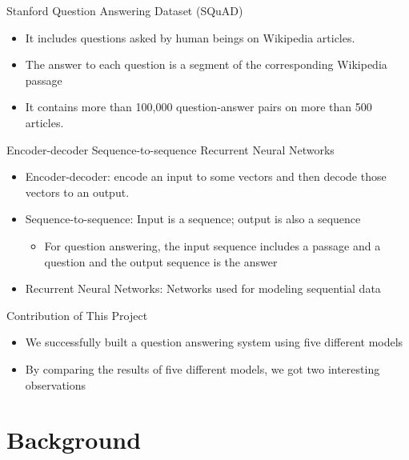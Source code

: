 \documentclass{beamer}
\begin{document}
\begin{frame}{Stanford Question Answering Dataset (SQuAD)}
    \begin{itemize}
        \item It includes questions asked by human beings on Wikipedia articles.
        \item The answer to each question is a segment of the corresponding Wikipedia passage
        \item It contains more than 100,000 question-answer pairs on more than 500 articles.
    \end{itemize}
\end{frame}

\begin{frame}{Encoder-decoder Sequence-to-sequence Recurrent Neural Networks}
   \begin{itemize}
       \item Encoder-decoder:  encode an input to some vectors and then decode those vectors to an output.
       \item Sequence-to-sequence: Input is a sequence; output is also a sequence
            \begin{itemize}
                \item For question answering, the input sequence includes a passage and a question and the output sequence is the answer
            \end{itemize}
       \item Recurrent Neural Networks: Networks used for modeling sequential data

   \end{itemize}
\end{frame}

\begin{frame}{Contribution of This Project}
    \begin{itemize}
        \item We successfully built a question answering system using five different models
        \item By comparing the results of five different models, we got two interesting observations
    \end{itemize}
\end{frame}

\section{Background}
\end{document}
